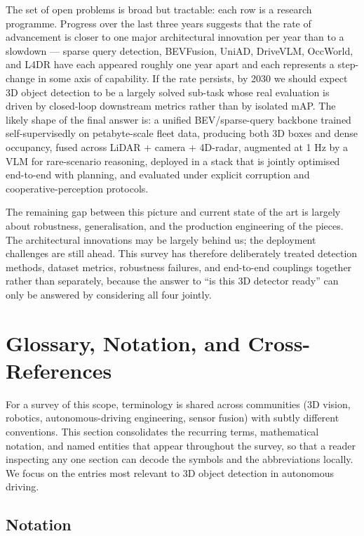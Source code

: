 \documentclass{article}
\begin{document}
The set of open problems is broad but tractable: each row is a research programme. Progress over the last three years suggests that the rate of advancement is closer to one major architectural innovation per year than to a slowdown --- sparse query detection, BEVFusion, UniAD, DriveVLM, OccWorld, and L4DR have each appeared roughly one year apart and each represents a step-change in some axis of capability. If the rate persists, by 2030 we should expect 3D object detection to be a largely solved sub-task whose real evaluation is driven by closed-loop downstream metrics rather than by isolated mAP. The likely shape of the final answer is: a unified BEV/sparse-query backbone trained self-supervisedly on petabyte-scale fleet data, producing both 3D boxes and dense occupancy, fused across LiDAR + camera + 4D-radar, augmented at 1 Hz by a VLM for rare-scenario reasoning, deployed in a stack that is jointly optimised end-to-end with planning, and evaluated under explicit corruption and cooperative-perception protocols.

The remaining gap between this picture and current state of the art is largely about robustness, generalisation, and the production engineering of the pieces. The architectural innovations may be largely behind us; the deployment challenges are still ahead. This survey has therefore deliberately treated detection methods, dataset metrics, robustness failures, and end-to-end couplings together rather than separately, because the answer to ``is this 3D detector ready'' can only be answered by considering all four jointly.
\section{Glossary, Notation, and Cross-References}\label{sec:glossary-notation-and-cross-references}
For a survey of this scope, terminology is shared across communities (3D vision, robotics, autonomous-driving engineering, sensor fusion) with subtly different conventions. This section consolidates the recurring terms, mathematical notation, and named entities that appear throughout the survey, so that a reader inspecting any one section can decode the symbols and the abbreviations locally. We focus on the entries most relevant to 3D object detection in autonomous driving.

\subsection{Notation}\label{notation}
\end{document}
